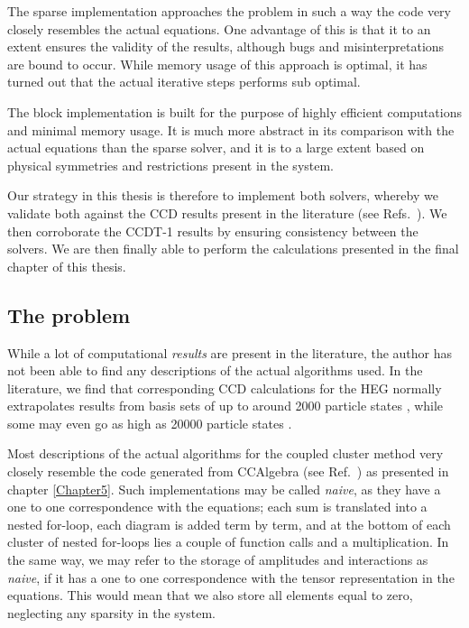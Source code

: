 The sparse implementation approaches the problem in such a way the
code very closely resembles the actual equations. One advantage of
this is that it to an extent ensures the validity of the results,
although bugs and misinterpretations are bound to occur. While memory
usage of this approach is optimal, it has turned out that the actual
iterative steps performs sub optimal.

The block implementation is built for the purpose of highly efficient
computations and minimal memory usage. It is much more abstract in its
comparison with the actual equations than the sparse solver, and it is
to a large extent based on physical symmetries and restrictions
present in the system.

Our strategy in this thesis is therefore to implement both solvers,
whereby we validate both against the CCD results present in the
literature (see Refs.~\cite{Baardsen2014, Roggero2013, Shepherd2012a,
  Shepherd2012, Shepherd2013, Shepherd2013c}). We then corroborate the
CCDT-1 results by ensuring consistency between the solvers. We are
then finally able to perform the calculations presented in the final
chapter of this thesis.


\subsection{The problem}

While a lot of computational \emph{results} are present in the
literature, the author has not been able to find any descriptions of
the actual algorithms used. In the literature, we find that
corresponding CCD calculations for the HEG normally extrapolates
results from basis sets of up to around 2000 particle states
\cite{Shepherd2014, Roggero2013}, while some may even go as high as
20000 particle states \cite{Baardsen2014}.

Most descriptions of the actual algorithms for the coupled cluster method very closely resemble the code generated from CCAlgebra (see Ref.~\cite{CCAlgebra}) as presented in chapter \ref{Chapter5}. Such implementations may be called \emph{naive}, as they have a one to one correspondence with the equations; each sum is translated into a nested for-loop, each diagram is added term by term, and at the bottom of each cluster of nested for-loops lies a couple of function calls and a multiplication. In the same way, we may refer to the storage of amplitudes and interactions as \emph{naive}, if it has a one to one correspondence with the tensor representation in the equations. This would mean that we also store all elements equal to zero, neglecting any sparsity in the system.

